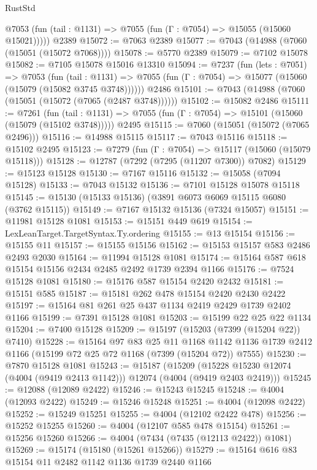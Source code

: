 \begin{lexlean}{RustStd}
\begin{coremodule}
      @7053 (fun (tail : @1131) => @7055 (fun (Γ : @7054) => @15055 (@15060 @15021)))))
    @2389
@15072 := @7063 @2389
@15077 := @7043 (@14988 (@7060 (@15051 (@15072 @7068))))
@15078 := @5770 @2389
@15079 := @7102 @15078
@15082 := @7105 @15078 @15016 @13310
@15094 := @7237
    (fun (lets : @7051) =>
    @7053
      (fun (tail : @1131) =>
      @7055 (fun (Γ : @7054) => @15077 (@15060 (@15079 (@15082 @3745 @3748))))))
    @2486
@15101 := @7043 (@14988 (@7060 (@15051 (@15072 (@7065 (@2487 @3748))))))
@15102 := @15082 @2486
@15111 := @7261
    (fun (tail : @1131) => @7055 (fun (Γ : @7054) => @15101 (@15060 (@15079 (@15102 @3748)))))
    @2495
@15115 := @7060 (@15051 (@15072 (@7065 @2496)))
@15116 := @14988 @15115
@15117 := @7043 @15116
@15118 := @15102 @2495
@15123 := @7279 (fun (Γ : @7054) => @15117 (@15060 (@15079 @15118)))
@15128 := @12787 (@7292 (@7295 (@11207 @7300)) @7082)
@15129 := @15123 @15128
@15130 := @7167 @15116
@15132 := @15058 (@7094 @15128)
@15133 := @7043 @15132
@15136 := @7101 @15128 @15078 @15118
@15145 := @15130 (@15133 @15136) (@3891 @6073 @6069 @15115 @6080 (@3762 @15115))
@15149 := @7167 @15132 @15136 (@7324 @15057)
@15151 := @11981 @15128 @1081
@15153 := @15151 @449 @619
@15154 := LexLeanTarget.TargetSyntax.Ty.ordering
@15155 := @13 @15154
@15156 := @15155 @11
@15157 := @15155 @15156
@15162 := @15153 @15157 @583 @2486 @2493 @2030
@15164 := @11994 @15128 @1081
@15174 := @15164 @587 @618 @15154 @15156 @2434 @2485 @2492 @1739 @2394 @1166
@15176 := @7524 @15128 @1081
@15180 := @15176 @587 @15154 @2420 @2432
@15181 := @15151 @585
@15187 := @15181 @262 @478 @15154 @2420 @2430 @2422
@15197 := @15164 @81 @261 @25 @437 @1134 @2419 @2429 @1739 @2402 @1166
@15199 := @7391 @15128 @1081
@15203 := @15199 @22 @25 @22 @1134
@15204 := @7400 @15128
@15209 := @15197 (@15203 (@7399 (@15204 @22)) @7410)
@15228 := @15164
    @97
    @83
    @25
    @11
    @1168
    @1142
    @1136
    @1739
    @2412
    @1166
    (@15199 @72 @25 @72 @1168 (@7399 (@15204 @72)) @7555)
@15230 := @7870 @15128 @1081
@15243 := @15187
    (@15209 (@15228 @15230 @12074 (@4004 (@9419 @2413 @1142))) @12074 (@4004 (@9419 @2403 @2419)))
@15245 := @12088 (@12089 @2422)
@15246 := @15243 @15245
@15248 := @4004 (@12093 @2422)
@15249 := @15246 @15248
@15251 := @4004 (@12098 @2422)
@15252 := @15249 @15251
@15255 := @4004 (@12102 @2422 @478)
@15256 := @15252 @15255
@15260 := @4004 (@12107 @585 @478 @15154)
@15261 := @15256 @15260
@15266 := @4004 (@7434 (@7435 (@12113 @2422)) @1081)
@15269 := @15174 (@15180 (@15261 @15266))
@15279 := @15164 @616 @83 @15154 @11 @2482 @1142 @1136 @1739 @2440 @1166

\end{coremodule}
\end{lexlean}
